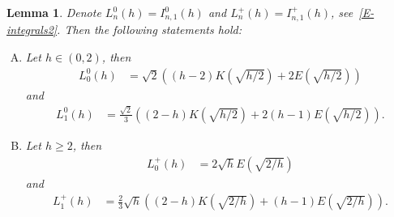 \documentclass[12pt,psamsfonts]{amsart}
\newtheorem {lemma}  [theorem]{Lemma}
\begin{document}
\begin{lemma}
\label{L-Integrals 0 1} Denote $L^0_n(h)=I^0_{n,1}(h)$ and $L^+_n(h)=I^+_{n,1}(h)$,
see~\eqref{E-integrals2}. Then the following statements hold:
\begin{enumerate}[(A)]
\item
Let $h\in(0,2)$, then
\begin{align*}
        L^0 _0(h) & = \sqrt{2}\left((h-2)K\left(\sqrt{{h}/{2}}\right) +
        2 E\left(\sqrt{{h}/{2}}\right)\right)
\end{align*}
and
\begin{align*}
        L^0 _1(h) & = \frac{\sqrt{2}}{3}\left((2-h)K\left(\sqrt{{h}/{2}}\right)
        + 2(h-1) E\left(\sqrt{{h}/{2}}\right)\right).
\end{align*}

\item Let $h\geq 2$, then
\begin{align*}
        L^+_0(h) 
                      & = 2\sqrt{h} E\left(\sqrt{{2}/{h}}\right)
\end{align*}
and \begin{align*}
        L^+_1(h) &  = \frac{2}{3} \sqrt{h}
                        \left((2-h)K\left(\sqrt{{2}/{h}}\right) + (h-1)
                        E\left(\sqrt{{2}/{h}}\right)\right).
\end{align*}
\end{enumerate}
\end{lemma}
\end{document}
